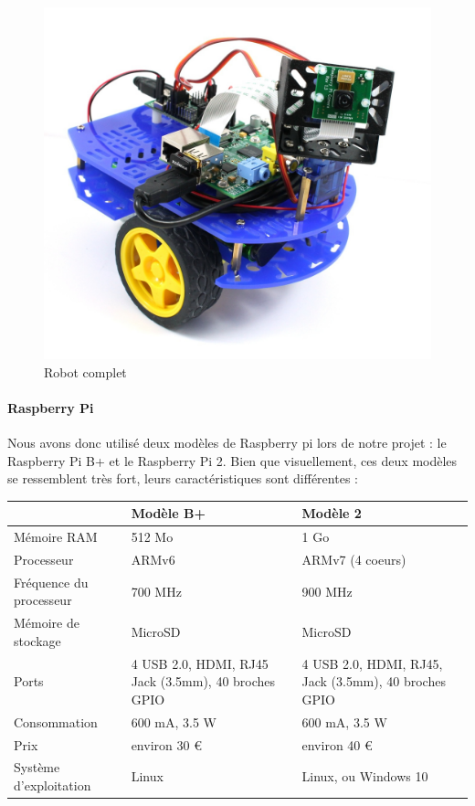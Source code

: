 \documentclass[12pt,a4paper]{report}
\begin{document}
\begin{figure}[hf!]
\center
\includegraphics[scale=0.2]{images/kit.jpg}
\caption{Robot complet}
\end{figure}

\paragraph{Raspberry Pi} Nous avons donc utilisé deux modèles de Raspberry pi lors de notre projet : le Raspberry Pi B+ et le Raspberry Pi 2. 
Bien que visuellement, ces deux modèles se ressemblent très fort, leurs caractéristiques sont différentes :

\begin{tabular}{l|p{4.5 cm}|p{4.5 cm}}
 & Modèle B+ & Modèle 2 \\ 
\hline 
Mémoire RAM & 512 Mo & 1 Go \\ 
Processeur & ARMv6 & ARMv7 (4 coeurs) \\
Fréquence du processeur & 700 MHz & 900 MHz \\
Mémoire de stockage & MicroSD & MicroSD \\
Ports & 4 USB 2.0, HDMI, RJ45 \newline Jack (3.5mm), 40 broches GPIO & 4 USB 2.0, HDMI, RJ45, Jack (3.5mm), 40 broches GPIO \\
Consommation & 600 mA, 3.5 W & 600 mA, 3.5 W \\
Prix & environ 30 \euro & environ 40 \euro \\
Système d'exploitation & Linux & Linux, ou Windows 10
\end{tabular}
\end{document}
